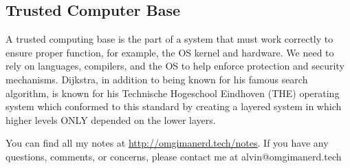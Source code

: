\documentclass{math}
\begin{document}
\subsection*{Trusted Computer Base}
A trusted computing base is the part of a system that must work correctly to
ensure proper function, for example, the OS kernel and hardware. We need to
rely on languages, compilers, and the OS to help enforce protection and security
mechanisms. Dijkstra, in addition to being known for his famous search
algorithm, is known for his Technische Hogeschool Eindhoven (THE) operating
system which conformed to this standard by creating a layered system in which
higher levels ONLY depended on the lower layers.

\begin{center}
  You can find all my notes at \url{http://omgimanerd.tech/notes}. If you have
  any questions, comments, or concerns, please contact me at
  alvin@omgimanerd.tech
\end{center}
\end{document}
